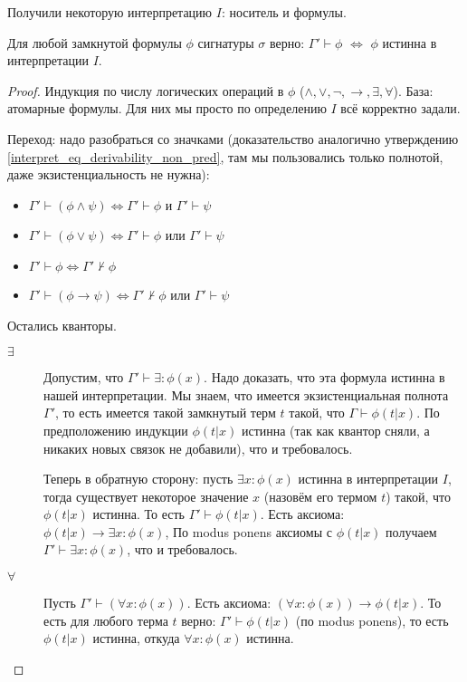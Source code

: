 		Получили некоторую интерпретацию $I$: носитель и формулы.
		\begin{assertion}
			Для любой замкнутой формулы $\phi$ сигнатуры $\sigma$ верно:
			$\Gamma' \vdash \phi$ $\iff$ $\phi$ истинна в интерпретации $I$.
		\end{assertion}
		\begin{proof}
			Индукция по числу логических операций в $\phi$ ($\land, \lor, \lnot, \to, \exists, \forall$).
			База: атомарные формулы. Для них мы просто по определению $I$ всё корректно задали.

			Переход: надо разобраться со значками (доказательство аналогично утверждению \ref{interpret_eq_derivability_non_pred},
  			там мы пользовались только полнотой, даже экзистенциальность не нужна):
			\begin{itemize}
				\item $\Gamma' \vdash (\phi \land \psi) \iff \Gamma' \vdash \phi$ и $\Gamma' \vdash\psi$
				\item $\Gamma' \vdash (\phi \lor \psi) \iff \Gamma' \vdash \phi$ или $\Gamma' \vdash\psi$
				\item $\Gamma' \vdash \phi \iff \Gamma' \nvdash \phi$
				\item $\Gamma' \vdash (\phi \to \psi) \iff \Gamma' \nvdash \phi$ или $\Gamma' \vdash \psi$
			\end{itemize}

			Остались кванторы.
  			\begin{description}
  			\item[$\exists$]
   			Допустим, что $\Gamma' \vdash \exists \colon \phi(x)$.
			Надо доказать, что эта формула истинна в нашей интерпретации.
				Мы знаем, что имеется экзистенциальная полнота $\Gamma'$, то есть
				имеется такой замкнутый терм $t$ такой, что $\Gamma \vdash \phi(t|x)$.
				По предположению индукции $\phi(t|x)$ истинна (так как квантор сняли,
				а никаких новых связок не добавили), что и требовалось.

				Теперь в обратную сторону: пусть $\exists x \colon \phi(x)$ истинна в интерпретации
				$I$, тогда существует некоторое значение $x$ (назовём его термом $t$) такой, что
				$\phi(t|x)$ истинна.
				То есть $\Gamma' \vdash \phi(t|x)$.
				Есть аксиома: $\phi(t|x) \to \exists x \colon \phi(x)$,
				По modus ponens аксиомы с $\phi(t|x)$ получаем $\Gamma' \vdash \exists x \colon \phi(x)$,
				что и требовалось.

			\item[$\forall$]
				Пусть $\Gamma' \vdash (\forall x \colon \phi(x))$.
				Есть аксиома: $(\forall x \colon \phi(x)) \to \phi(t|x)$.
				То есть для любого терма $t$ верно: $\Gamma' \vdash \phi(t|x)$ (по modus ponens),
				то есть $\phi(t|x)$ истинна, откуда $\forall x \colon \phi(x)$ истинна.


\end{description}
\end{proof}
